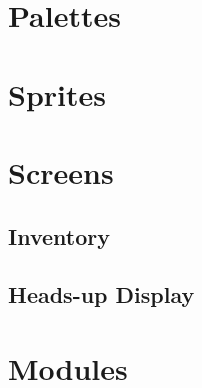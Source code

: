\documentclass[12pt, oneside]{report}
\begin{document}
\chapter{Palettes}

\chapter{Sprites}

\chapter{Screens}
  \section{Inventory}
  \section{Heads-up Display}

\chapter{Modules}
\end{document}
